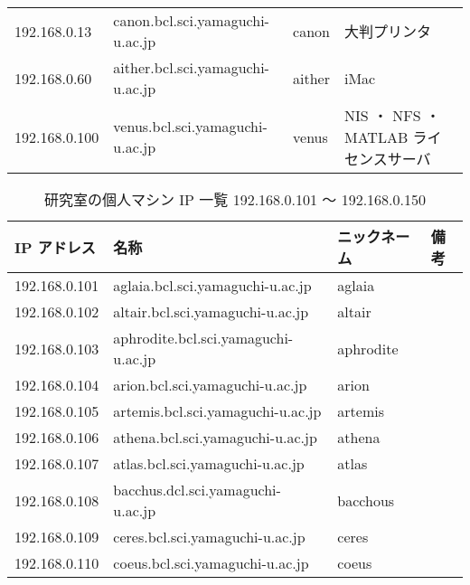 \documentclass{jarticle}
\begin{document}
{\begin{table}[tbp]
\begin{tabular}[t]{llll}
192.168.0.13 &	canon.bcl.sci.yamaguchi-u.ac.jp &	canon &		大判プリンタ \\
192.168.0.60 &	aither.bcl.sci.yamaguchi-u.ac.jp &      aither &	iMac \\
192.168.0.100 &	venus.bcl.sci.yamaguchi-u.ac.jp &	venus &		NIS ・ NFS ・ MATLAB ライセンスサーバ\\
\hline
\end{tabular}
\end{table}
}
{\small
\begin{table}[tbp]
\centering
\caption{研究室の個人マシン IP 一覧 192.168.0.101 〜 192.168.0.150 } \label{tab:IP2}
\begin{tabular}[t]{llll}\hline
IP アドレス &	名称 &					ニックネーム &	備考 \\ \hline
192.168.0.101 &	aglaia.bcl.sci.yamaguchi-u.ac.jp &	aglaia & \\
192.168.0.102 &	altair.bcl.sci.yamaguchi-u.ac.jp &	altair & \\
192.168.0.103 &	aphrodite.bcl.sci.yamaguchi-u.ac.jp &	aphrodite & \\
192.168.0.104 &	arion.bcl.sci.yamaguchi-u.ac.jp &	arion & \\
192.168.0.105 &	artemis.bcl.sci.yamaguchi-u.ac.jp &	artemis & \\
192.168.0.106 &	athena.bcl.sci.yamaguchi-u.ac.jp &	athena & \\
192.168.0.107 &	atlas.bcl.sci.yamaguchi-u.ac.jp &	atlas & \\
192.168.0.108 &	bacchus.dcl.sci.yamaguchi-u.ac.jp &	bacchous & \\
192.168.0.109 &	ceres.bcl.sci.yamaguchi-u.ac.jp &	ceres & \\
192.168.0.110 &	coeus.bcl.sci.yamaguchi-u.ac.jp &	coeus &  \\
\hline
\end{tabular}
\end{table}
}
\end{document}

